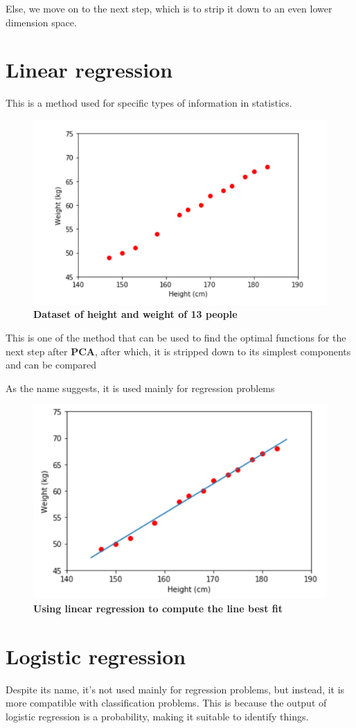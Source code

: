\documentclass{article}
\begin{document}
Else, we move on to the next step, which is to strip it down to an even lower dimension space.

\section{Linear regression}

This is a method used for specific types of information in statistics.

\begin{figure}[h]
    \includegraphics[width=12cm]{Capture2.PNG}
    \caption{\textbf{Dataset of height and weight of 13 people}}
\end{figure}





This is one of the method that can be used to find the optimal functions for the next step after \textbf{PCA}, after which, it is stripped down to its simplest components and can be compared

As the name suggests, it is used mainly for regression problems

\begin{figure}[H]
    \includegraphics[width=12cm]{Capture3.PNG}
    \caption{\textbf{Using linear regression to compute the line best fit}}
\end{figure}

\section{Logistic regression}

Despite its name, it's not used mainly for regression problems, but instead, it is more compatible with classification problems. This is because the output of logistic regression is a probability, making it suitable to identify things. 
\end{document}
